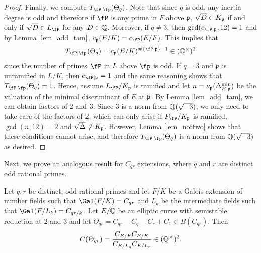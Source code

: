 \begin{proof}
    Finally, we compute $\Tp(\Theta_q)$. Note that since $q$ is odd, any inertia degree is odd and therefore if $\fP$ is any prime in $F$ above $\mathfrak{p}$, $\sqrt{D}\in K_{\mathfrak{p}}$ if and only if $\sqrt{D}\in L_\fP$ for any $D\in\mathbb{Q}$. Moreover, if $q\neq 3$, then $\gcd(e_{\fP\mid\pp},12)=1$ and by Lemma \ref{lem_add_tam}, $c_\pp(E/K)=c_\fP(E/F)$. This implies that $$\Tp(\Theta_q)=c_\pp(E/K)^{\#\{\fP\mid\pp\}-1}\in\QQss$$ since the number of primes $\fP$ in $L$ above $\fp$ is odd. If $q=3$ and $\mathfrak{p}$ is unramified in $L/K$, then $e_{\fP\mid\pp}=1$ and the same reasoning shows that $\Tp(\Theta_q)=1$. Hence, assume $L_\fP/K_\pp$ is ramified and let $n=\nu_{\mathfrak{p}}(\Delta_{E,\mathfrak{p}}^{\min})$ be the valuation of the minimal discriminant of $E$ at $\mathfrak{p}$. By Lemma \ref{lem_add_tam}, we can obtain factors of $2$ and $3$. Since $3$ is a norm from $\mathbb{Q}(\sqrt{-3})$, we only need to take care of the factors of $2$, which can only arise if $F_\fP/K_\pp$ is ramified, $\gcd(n,12)=2$ and $\sqrt{\Delta}\not\in K_{\mathfrak{p}}$. However, Lemma \ref{lem_nottwo} shows that these conditions cannot arise, and therefore $\Tp(\Theta_q)$ is a norm from $\mathbb{Q}(\sqrt{-3})$ as desired.
\end{proof}


Next, we prove an analogous result for $C_{qr}$ extensions, where $q$ and $r$ are distinct odd rational primes.

\begin{lemma}\label{lem_Cpq}
    Let $q,r$ be distinct, odd rational primes and let $F/K$ be a Galois extension of number fields such that $\Gal(F/K)=C_{qr}$ and $L_k$ be the intermediate fields such that $\Gal(F/L_k)=C_{qr/k}$. Let $E/\mathbb{Q}$ be an elliptic curve with semistable reduction at $2$ and $3$ and let $\Theta_{qr}=C_{qr}-C_q-C_r+C_1\in B(C_{qr})$. Then
    $$C(\Theta_{qr})=\frac{C_{E/F}C_{E/K}}{C_{E/L_q}C_{E/L_r}}\in(\mathbb{Q}^{\times})^2.$$
    
\end{lemma}

